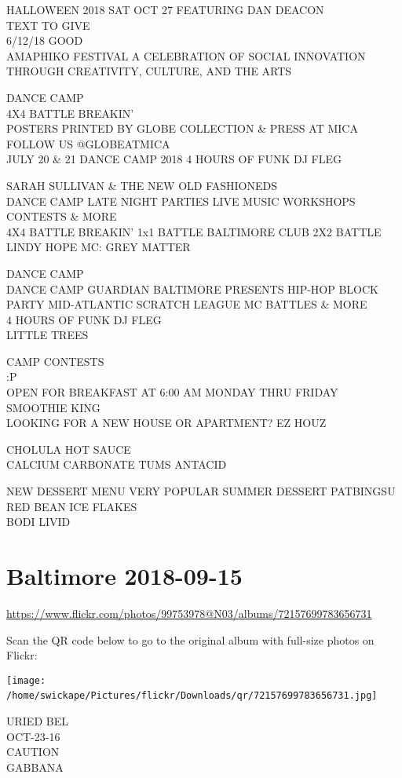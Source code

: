 \documentclass[10pt,letterpaper]{article}
\begin{document}
HALLOWEEN 2018 SAT OCT 27 FEATURING DAN DEACON\\
TEXT TO GIVE\\
6/12/18 GOOD\\
AMAPHIKO FESTIVAL A CELEBRATION OF SOCIAL INNOVATION THROUGH CREATIVITY, CULTURE, AND THE ARTS

DANCE CAMP\\
4X4 BATTLE BREAKIN'\\
POSTERS PRINTED BY GLOBE COLLECTION \& PRESS AT MICA FOLLOW US @GLOBEATMICA\\
JULY 20 \& 21 DANCE CAMP 2018 4 HOURS OF FUNK DJ FLEG

SARAH SULLIVAN \& THE NEW OLD FASHIONEDS\\
DANCE CAMP LATE NIGHT PARTIES LIVE MUSIC WORKSHOPS CONTESTS \& MORE\\
4X4 BATTLE BREAKIN' 1x1 BATTLE BALTIMORE CLUB 2X2 BATTLE LINDY HOPE MC: GREY MATTER

DANCE CAMP\\
DANCE CAMP GUARDIAN BALTIMORE PRESENTS HIP{-}HOP BLOCK PARTY MID{-}ATLANTIC SCRATCH LEAGUE MC BATTLES \& MORE\\
4 HOURS OF FUNK DJ FLEG\\
LITTLE TREES

CAMP CONTESTS\\
:P\\
OPEN FOR BREAKFAST AT 6:00 AM MONDAY THRU FRIDAY SMOOTHIE KING\\
LOOKING FOR A NEW HOUSE OR APARTMENT?  EZ HOUZ

CHOLULA HOT SAUCE\\
CALCIUM CARBONATE TUMS ANTACID

NEW DESSERT MENU VERY POPULAR SUMMER DESSERT 
PATBINGSU RED BEAN ICE FLAKES\\
BODI LIVID
\

\section*{Baltimore 2018-09-15}

\url{https://www.flickr.com/photos/99753978@N03/albums/72157699783656731}

Scan the QR code below to go to the original album with full-size photos on Flickr:

\texttt{[image: /home/swickape/Pictures/flickr/Downloads/qr/72157699783656731.jpg]}
\

URIED BEL\\
OCT{-}23{-}16\\
CAUTION\\
GABBANA
\end{document}
